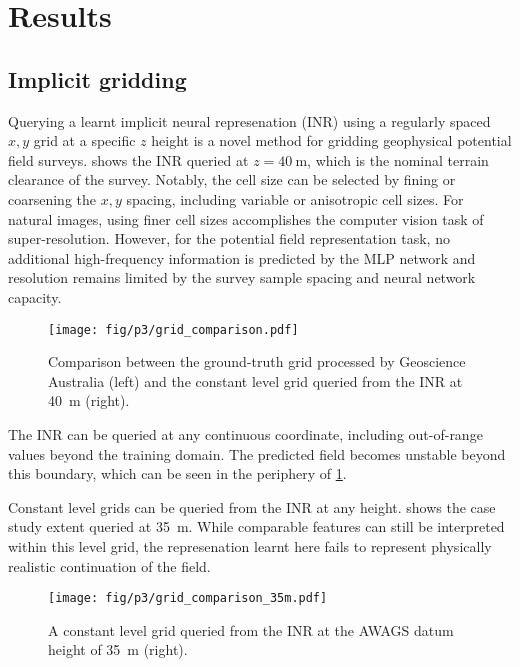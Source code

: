 \documentclass[manuscript.tex]{subfiles}
\begin{document}
\section{Results}
\subsection{Implicit gridding}
Querying a learnt implicit neural represenation (INR) using a regularly spaced \(x,y\) grid at a specific \(z\) height is a novel method for gridding geophysical potential field surveys.
 shows the INR queried at \(z=\SI{40}{\meter}\), which is the nominal terrain clearance of the survey.
Notably, the cell size can be selected by fining or coarsening the \(x,y\) spacing, including variable or anisotropic cell sizes.
For natural images, using finer cell sizes accomplishes the computer vision task of super-resolution.
However, for the potential field representation task, no additional high-frequency information is predicted by the MLP network and resolution remains limited by the survey sample spacing and neural network capacity.

\begin{figure}[hbt]
    \texttt{[image: fig/p3/grid\_comparison.pdf]}
    \caption[Grid prediction]{Comparison between the ground-truth grid processed by Geoscience Australia (left) and the constant level grid queried from the INR at \SI{40}{\m} (right).}
    \label{fig:grid}
\end{figure}

The INR can be queried at any continuous coordinate, including out-of-range values beyond the training domain.
The predicted field becomes unstable beyond this boundary, which can be seen in the periphery of \cref{fig:grid}.

Constant level grids can be queried from the INR at any height.
 shows the case study extent queried at \SI{35}{m}.
While comparable features can still be interpreted within this level grid, the represenation learnt here fails to represent physically realistic continuation of the field.

\begin{figure}[hbt]
    \texttt{[image: fig/p3/grid\_comparison\_35m.pdf]}
    \caption[Grid prediction]{A constant level grid queried from the INR at the AWAGS datum height of \SI{35}{m} (right).}
    \label{fig:grid35}
\end{figure}
\end{document}
